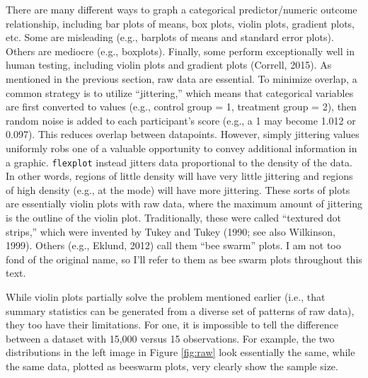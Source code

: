 \documentclass[
  english,
  man]{apa6}
\begin{document}
There are many different ways to graph a categorical predictor/numeric outcome relationship, including bar plots of means, box plots, violin plots, gradient plots, etc. Some are misleading (e.g., barplots of means and standard error plots). Others are mediocre (e.g., boxplots). Finally, some perform exceptionally well in human testing, including violin plots and gradient plots (Correll, 2015). As mentioned in the previous section, raw data are essential. To minimize overlap, a common strategy is to utilize ``jittering,'' which means that categorical variables are first converted to values (e.g., control group = 1, treatment group = 2), then random noise is added to each participant's score (e.g., a 1 may become 1.012 or 0.097). This reduces overlap between datapoints. However, simply jittering values uniformly robs one of a valuable opportunity to convey additional information in a graphic. \texttt{flexplot} instead jitters data proportional to the density of the data. In other words, regions of little density will have very little jittering and regions of high density (e.g., at the mode) will have more jittering. These sorts of plots are essentially violin plots with raw data, where the maximum amount of jittering is the outline of the violin plot. Traditionally, these were called ``textured dot strips,'' which were invented by Tukey and Tukey (1990; see also Wilkinson, 1999). Others (e.g., Eklund, 2012) call them ``bee swarm'' plots. I am not too fond of the original name, so I'll refer to them as bee swarm plots throughout this text.

While violin plots partially solve the problem mentioned earlier (i.e., that summary statistics can be generated from a diverse set of patterns of raw data), they too have their limitations. For one, it is impossible to tell the difference between a dataset with 15,000 versus 15 observations. For example, the two distributions in the left image in Figure \ref{fig:raw} look essentially the same, while the same data, plotted as beeswarm plots, very clearly show the sample size.

\small
\end{document}
